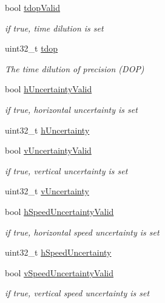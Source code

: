 \begin{DoxyCompactItemize}
bool \hyperlink{structpa___gnss___position__t_a995b2352c82b691f5a9766a3f4efcc7b}{tdop\+Valid}
\begin{DoxyCompactList}\small\item\em if true, time dilution is set \end{DoxyCompactList}\item 
uint32\+\_\+t \hyperlink{structpa___gnss___position__t_aab92913c21432b55ba1249a889a4b573}{tdop}
\begin{DoxyCompactList}\small\item\em The time dilution of precision (D\+OP) \end{DoxyCompactList}\item 
bool \hyperlink{structpa___gnss___position__t_a6f34e02db6085135cedef788b18dfefd}{h\+Uncertainty\+Valid}
\begin{DoxyCompactList}\small\item\em if true, horizontal uncertainty is set \end{DoxyCompactList}\item 
uint32\+\_\+t \hyperlink{structpa___gnss___position__t_a9d7d33d52e812e7b2ade427b68df9530}{h\+Uncertainty}
\item 
bool \hyperlink{structpa___gnss___position__t_af255c1cb921b90bc9b3e4ed8379010cb}{v\+Uncertainty\+Valid}
\begin{DoxyCompactList}\small\item\em if true, vertical uncertainty is set \end{DoxyCompactList}\item 
uint32\+\_\+t \hyperlink{structpa___gnss___position__t_a4d362f10e240732d4cfab4603d590ca6}{v\+Uncertainty}
\item 
bool \hyperlink{structpa___gnss___position__t_aca8965f7b4816b327e5872f935876aea}{h\+Speed\+Uncertainty\+Valid}
\begin{DoxyCompactList}\small\item\em if true, horizontal speed uncertainty is set \end{DoxyCompactList}\item 
uint32\+\_\+t \hyperlink{structpa___gnss___position__t_ad559e322f94d0e494540ae0e0ff56002}{h\+Speed\+Uncertainty}
\item 
bool \hyperlink{structpa___gnss___position__t_acdc3d05933522d411f1dd89c74bbaa86}{v\+Speed\+Uncertainty\+Valid}
\begin{DoxyCompactList}\small\item\em if true, vertical speed uncertainty is set \end{DoxyCompactList}\item 

\end{DoxyCompactItemize}
